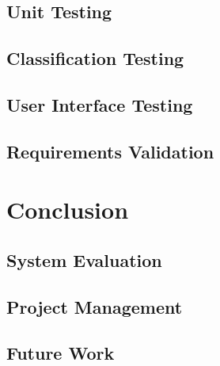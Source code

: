 \documentclass[12pt,a4paper]{article}
\begin{document}
    \subsection{Unit Testing}
    \subsection{Classification Testing}
    \subsection{User Interface Testing}
    \subsection{Requirements Validation}

\section{Conclusion}
    \subsection{System Evaluation}
    \subsection{Project Management}
    \subsection{Future Work}

\pagebreak
\end{document}
